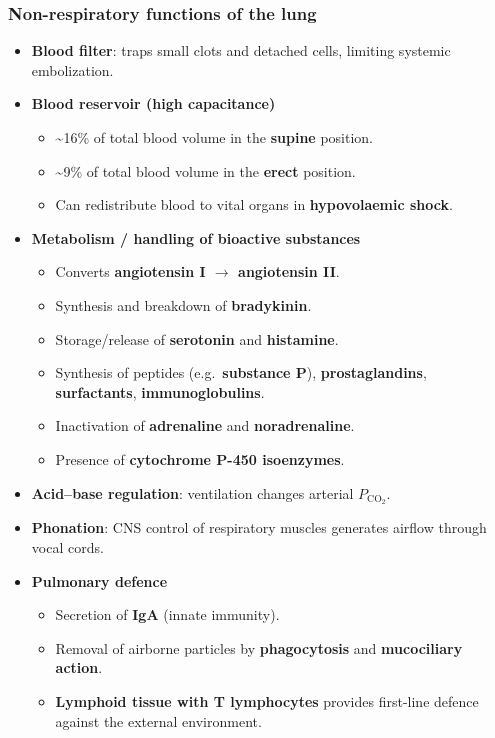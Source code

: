 \documentclass[11pt,a4paper]{article}
\begin{document}
\subsubsection{Non-respiratory functions of the lung}
\begin{itemize}[leftmargin=*,nosep]
  \item \textbf{Blood filter}: traps small clots and detached cells, limiting systemic embolization.
  \item \textbf{Blood reservoir (high capacitance)}
  \begin{itemize}[leftmargin=*,nosep]
    \item \textasciitilde16\% of total blood volume in the \textbf{supine} position.
    \item \textasciitilde9\% of total blood volume in the \textbf{erect} position.
    \item Can redistribute blood to vital organs in \textbf{hypovolaemic shock}.
  \end{itemize}
  \item \textbf{Metabolism / handling of bioactive substances}
  \begin{itemize}[leftmargin=*,nosep]
    \item Converts \textbf{angiotensin I $\rightarrow$ angiotensin II}.
    \item Synthesis and breakdown of \textbf{bradykinin}.
    \item Storage/release of \textbf{serotonin} and \textbf{histamine}.
    \item Synthesis of peptides (e.g.\ \textbf{substance P}), \textbf{prostaglandins}, \textbf{surfactants}, \textbf{immunoglobulins}.
    \item Inactivation of \textbf{adrenaline} and \textbf{noradrenaline}.
    \item Presence of \textbf{cytochrome P-450 isoenzymes}.
  \end{itemize}
  \item \textbf{Acid--base regulation}: ventilation changes arterial $P_{\mathrm{CO_2}}$.
  \item \textbf{Phonation}: CNS control of respiratory muscles generates airflow through vocal cords.
  \item \textbf{Pulmonary defence}
  \begin{itemize}[leftmargin=*,nosep]
    \item Secretion of \textbf{IgA} (innate immunity).
    \item Removal of airborne particles by \textbf{phagocytosis} and \textbf{mucociliary action}.
    \item \textbf{Lymphoid tissue with T lymphocytes} provides first-line defence against the external environment.
  \end{itemize}
\end{itemize}
\end{document}
